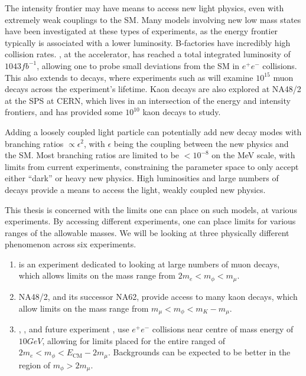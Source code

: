 \label{chapter:experiments}

The intensity frontier may have means to access new light physics, even with extremely weak couplings to the SM.
Many models involving new low mass states have been investigated at these types of experiments, as the energy frontier typically is associated with a lower luminosity.
B-factories have incredibly high collision rates.
\belle, at the \kekb accelerator, has reached a total integrated luminosity of $1043fb^{-1}$, allowing one to probe small deviations from the SM in $e^+ e^-$ collisions.
This also extends to decays, where experiments such as \mueee will examine $10^{15}$ muon decays across the experiment's lifetime.
Kaon decays are also explored at NA48/2 at the SPS at CERN, which lives in an intersection of the energy and intensity frontiers, and has provided some $10^{10}$ kaon decays to study.

Adding a loosely coupled light particle can potentially add new decay modes with branching ratios $\propto \epsilon^2$, with $\epsilon$ being the coupling between the new physics and the SM.
Most branching ratios are limited to be $< 10^{-8}$ on the MeV scale, with limits from current experiments, constraining the parameter space to only accept either ``dark'' or heavy new physics.
High luminosities and large numbers of decays provide a means to access the light, weakly coupled new physics.

This thesis is concerned with the limits one can place on such models, at various experiments.
By accessing different experiments, one can place limits for various ranges of the allowable masses.
We will be looking at three physically different phenomenon across six experiments.
\begin{enumerate}
    \item \mueee is an experiment dedicated to looking at large numbers of muon decays, which allows limits on the mass range from $2 m_e < m_\phi < m_\mu$.
    \item NA48/2, and its successor NA62, provide access to many kaon decays, which allow limits on the mass range from $m_\mu < m_\phi < m_K - m_\mu$.
    \item \babar, \belle, and future experiment \belletwo, use $e^+ e^-$ collisions near centre of mass energy of $10GeV$, allowing for limits placed for the entire ranged of $2m_e < m_\phi < E_\textrm{CM} - 2 m_\mu$. Backgrounds can be expected to be better in the region of $m_\phi > 2 m_\mu$.
\end{enumerate}




